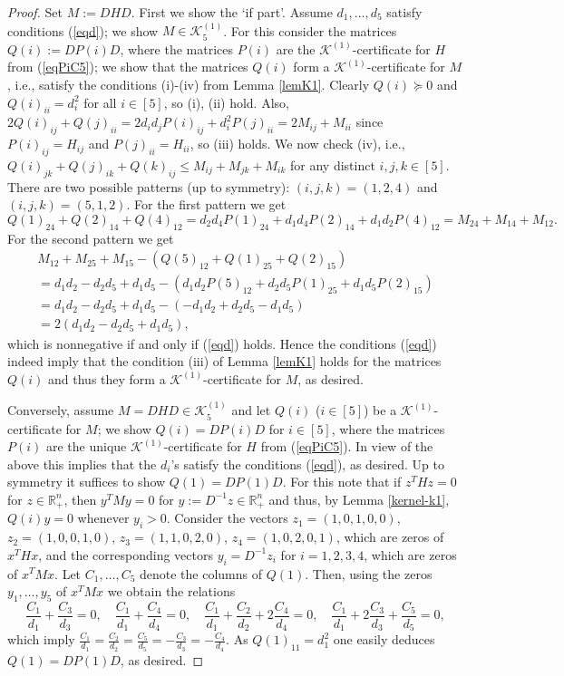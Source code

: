 \documentclass[11pt]{article}
\newcommand{\oR}{{\mathbb R}}
\numberwithin{equation}{section}
\newcommand{\MK}{{\mathcal K}}
\begin{document}
\begin{proof}
Set $M:=DHD$. First we show the `if part'. Assume $d_1,\ldots,d_5$ satisfy  conditions (\ref{eqd}); we show $M\in \MK^{(1)}_5$. For this consider the matrices $Q(i):=DP(i)D$, where the matrices $P(i)$ are the $\MK^{(1)}$-certificate for $H$ from (\ref{eqPiC5}); we show that the matrices $Q(i)$ form a $\MK^{(1)}$-certificate for $M$, i.e., satisfy the conditions (i)-(iv) from Lemma \ref{lemK1}. Clearly $Q(i)\succeq 0$ and $Q(i)_{ii}=d_i^2$ for all $i\in [5]$, so (i), (ii) hold.
Also, $2Q(i)_{ij}+Q(j)_{ii}=2d_id_j P(i)_{ij}+d_i^2 P(j)_{ii}= 2M_{ij}+M_{ii}$ since $P(i)_{ij}=H_{ij}$ and $P(j)_{ii}=H_{ii}$, so (iii) holds.
We now check (iv), i.e., $Q(i)_{jk}+Q(j)_{ik}+Q(k)_{ij}\le M_{ij}+M_{jk}+M_{ik}$ for any distinct $i,j,k\in [5]$. There are two possible patterns (up to symmetry): $(i,j,k)= (1,2,4)$ and  $(i,j,k)= (5,1,2)$. For the first pattern we get
$$Q(1)_{24}+Q(2)_{14}+Q(4)_{12}= d_2d_4 P(1)_{24}+ d_1d_4P(2)_{14} + d_1d_2 P(4)_{12}= M_{24}+M_{14}+M_{12}.$$ For the second pattern we get
$$\begin{array}{ll}
M_{12}+M_{25}+M_{15}-(Q(5)_{12}+Q(1)_{25}+Q(2)_{15}) \\
 = d_1d_2-d_2d_5+d_1d_5 -( d_1d_2 P(5)_{12}+d_2d_5 P(1)_{25}+d_1d_5 P(2)_{15}) \\
  = d_1d_2-d_2d_5+d_1d_5 - ( -d_1d_2+d_2d_5 -d_1d_5)\\
=  2(d_1d_2-d_2d_5+d_1d_5),
\end{array}
$$
which is nonnegative if and only if (\ref{eqd}) holds. Hence the conditions (\ref{eqd}) indeed imply that the condition (iii) of Lemma \ref{lemK1} holds for the matrices $Q(i)$ and thus they form a $\MK^{(1)}$-certificate for $M$, as desired. 


Conversely, assume $M=DHD\in \MK^{(1)}_5$ and let $Q(i)$ ($i\in [5]$) be a $\MK^{(1)}$-certificate for $M$; we show $Q(i)=DP(i)D$ for $i\in [5]$, where the matrices $P(i)$ are the unique $\MK^{(1)}$-certificate for $H$ from (\ref{eqPiC5}). In view of the above this implies  that the $d_i$'s satisfy the conditions (\ref{eqd}), as desired. 
Up to symmetry it suffices  to show $Q(1)=DP(1)D$. For this  note that if %
$z^THz=0$ for $z\in \oR^n_+$, then $y^TMy=0$ for $y:=D^{-1}z\in \oR^n_+$ %
 and thus,   by Lemma \ref{kernel-k1},  $Q(i)y=0$ whenever $y_i>0$. Consider the vectors $z_1=(1,0,1,0,0)$, $z_2=(1,0,0,1,0)$, $z_3=(1,1,0,2,0)$, $z_4=(1,0,2,0,1)$, which are zeros of $x^THx$, and the corresponding vectors $y_i=D^{-1}z_i$ for $i=1,2,3,4$, which are zeros of $x^TMx$. Let $C_1, \dots, C_5$ denote the columns of $Q(1)$. Then, using the zeros $y_1,\ldots,y_5$ of $x^TMx$   we obtain the relations
$$\frac{C_1}{d_1}+\frac{C_3}{d_3}=0, \quad
\frac{C_1}{d_1}+\frac{C_4}{d_4}= 0, \quad
\frac{C_1}{d_1}+\frac{C_2}{d_2} + 2\frac{C_4}{d_4} =0, \quad
\frac{C_1}{d_1} +2\frac{C_3}{d_3} +\frac{C_5}{d_5} =0,$$
which imply  $\frac{C_1}{d_1}=\frac{C_2}{d_2}=\frac{C_5}{d_5}=-\frac{C_3}{d_3}=-\frac{C_4}{d_4}$. As $Q(1)_{11}=d_1^2$ one  easily deduces   $Q(1)=DP(1)D$, as desired.
\end{proof}
\end{document}
